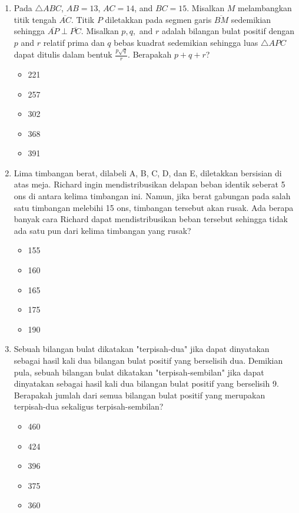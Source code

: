\documentclass[12pt]{scrartcl}
\begin{document}
\begin{enumerate}
    \item Pada $\triangle ABC$, $AB=13$, $AC=14$, and $BC=15$. Misalkan $M$ melambangkan titik tengah $\overline{AC}$. Titik $P$ diletakkan pada segmen garis $\overline{BM}$ sedemikian sehingga $\overline{AP}\perp\overline{PC}$. Misalkan $p, q,$ and $r$ adalah bilangan bulat positif dengan $p$ and $r$ relatif prima dan $q$ bebas kuadrat sedemikian sehingga luas $\triangle APC$ dapat ditulis dalam bentuk $\frac{p\sqrt{q}}{r}$. Berapakah $p+q+r$?
    \begin{itemize}
        \item[(A)] 221
        \item[(B)] 257
        \item[(C)] 302
        \item[(D)] 368
        \item[(E)] 391
    \end{itemize}

    \item Lima timbangan berat, dilabeli A, B, C, D, dan E, diletakkan bersisian di atas meja. Richard ingin mendistribusikan delapan beban identik seberat 5 ons di antara kelima timbangan ini. Namun, jika berat gabungan pada salah satu timbangan melebihi 15 ons, timbangan tersebut akan rusak. Ada berapa banyak cara Richard dapat mendistribusikan beban tersebut sehingga tidak ada satu pun dari kelima timbangan yang rusak?
    \begin{itemize}
        \item[(A)] 155
        \item[(B)] 160
        \item[(C)] 165
        \item[(D)] 175
        \item[(E)] 190
    \end{itemize}

    \item Sebuah bilangan bulat dikatakan "terpisah-dua" jika dapat dinyatakan sebagai hasil kali dua bilangan bulat positif yang berselisih dua. Demikian pula, sebuah bilangan bulat dikatakan "terpisah-sembilan" jika dapat dinyatakan sebagai hasil kali dua bilangan bulat positif yang berselisih 9. Berapakah jumlah dari semua bilangan bulat positif yang merupakan terpisah-dua sekaligus terpisah-sembilan?
    \begin{itemize}
        \item[(A)] 460
        \item[(B)] 424
        \item[(C)] 396
        \item[(D)] 375
        \item[(E)] 360
    \end{itemize}


\end{enumerate}
\end{document}
